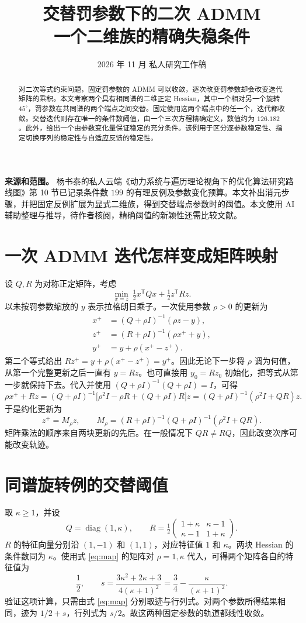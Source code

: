 \documentclass[UTF8,zihao=-4,fontset=windows]{ctexart}
\title{交替罚参数下的二次 ADMM\\一个二维族的精确失稳条件}
\author{}
\date{2026 年 11 月 \quad 私人研究工作稿}
\newcommand{\diag}{\operatorname{diag}}
\begin{document}
\maketitle

\begin{abstract}
对二次等式约束问题，固定罚参数的 ADMM 可以收敛，逐次改变罚参数却会改变迭代矩阵的乘积。本文考察两个具有相同谱的二维正定 Hessian，其中一个相对另一个旋转 $45^\circ$，罚参数在共同谱的两个端点之间交替。固定使用这两个端点中的任一个，迭代都收敛。交替迭代则存在唯一的条件数阈值，由一个三次方程精确定义，数值约为 $126.182$。此外，给出一个由参数变化量保证稳定的充分条件。该例用于区分逐参数稳定性、指定切换序列的稳定性与自适应反馈的稳定性。
\end{abstract}

\noindent\textbf{来源和范围。} 杨书泰的私人云端《动力系统与遍历理论视角下的优化算法研究路线图》第 10 节已记录条件数 $199$ 的有理反例及参数变化预算。本文补出消元步骤，并把固定反例扩展为显式二维族，得到交替端点参数时的阈值。本文使用 AI 辅助整理与推导，待作者核阅，精确阈值的新颖性还需比较文献。

\section{一次 ADMM 迭代怎样变成矩阵映射}
设 $Q,R$ 为对称正定矩阵，考虑
\[
 \min_{x=z}\ \tfrac12 x^\mathsf{T}Qx+\tfrac12 z^\mathsf{T}Rz .
\]
以未按罚参数缩放的 $y$ 表示拉格朗日乘子。一次使用参数 $\rho>0$ 的更新为
\begin{align*}
 x^+&=(Q+\rho I)^{-1}(\rho z-y),\\
 z^+&=(R+\rho I)^{-1}(\rho x^++y),\\
 y^+&=y+\rho(x^+-z^+).
\end{align*}
第二个等式给出 $Rz^+=y+\rho(x^+-z^+)=y^+$。因此无论下一步将 $\rho$ 调为何值，从第一个完整更新之后一直有 $y=Rz$。也可直接用 $y_0=Rz_0$ 初始化，把等式从第一步就保持下去。代入并使用 $(Q+\rho I)^{-1}(Q+\rho I)=I$，可得
\[
 \rho x^++Rz=(Q+\rho I)^{-1}
 \bigl[\rho^2 I-\rho R+(Q+\rho I)R\bigr]z
 =(Q+\rho I)^{-1}(\rho^2 I+QR)z.
\]
于是约化更新为
\begin{equation}
 z^+=M_\rho z,\qquad M_\rho=(R+\rho I)^{-1}(Q+\rho I)^{-1}(\rho^2 I+QR).
 \label{eq:map}
\end{equation}
矩阵乘法的顺序来自两块更新的先后。在一般情况下 $QR\ne RQ$，因此改变次序可能改变轨迹。

\section{同谱旋转例的交替阈值}
取 $\kappa\ge1$，并设
\[
 Q=\diag(1,\kappa),\qquad
 R=\tfrac12\begin{pmatrix}1+\kappa&\kappa-1\\ \kappa-1&1+\kappa\end{pmatrix}.
\]
$R$ 的特征向量分别沿 $(1,-1)$ 和 $(1,1)$，对应特征值 $1$ 和 $\kappa$。两块 Hessian 的条件数同为 $\kappa$。使用式 \eqref{eq:map} 的矩阵对 $\rho=1,\kappa$ 代入，可得两个矩阵各自的特征值为
\[
 \frac12,\qquad s=\frac{3\kappa^2+2\kappa+3}{4(\kappa+1)^2}
              =\frac34-\frac{\kappa}{(\kappa+1)^2}.
\]
验证这项计算，只需由式 \eqref{eq:map} 分别取迹与行列式。对两个参数所得结果相同，迹为 $1/2+s$，行列式为 $s/2$。故这两种固定参数的轨道都线性收敛。
\end{document}
